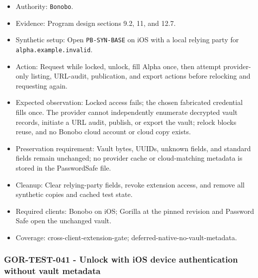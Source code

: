 \documentclass[
  letterpaper,
]{article}
\newcommand{\passthrough}[1]{#1}
\providecommand{\tightlist}{%
  \setlength{\itemsep}{0pt}\setlength{\parskip}{0pt}}
\begin{document}
\begin{itemize}
\tightlist
\item
  Authority: \passthrough{\lstinline!Bonobo!}.
\item
  Evidence: Program design sections 9.2, 11, and 12.7.
\item
  Synthetic setup: Open \nolinkurl{PB-SYN-BASE} on iOS with a local relying party for \nolinkurl{alpha.example.invalid}.
\item
  Action: Request while locked, unlock, fill Alpha once, then attempt provider-only listing, URL-audit, publication, and
  export actions before relocking and requesting again.
\item
  Expected observation: Locked access fails; the chosen fabricated credential fills once. The provider cannot
  independently enumerate decrypted vault records, initiate a URL audit, publish, or export the vault; relock blocks
  reuse, and no Bonobo cloud account or cloud copy exists.
\item
  Preservation requirement: Vault bytes, UUIDs, unknown fields, and standard fields remain unchanged; no provider cache
  or cloud-matching metadata is stored in the PasswordSafe file.
\item
  Cleanup: Clear relying-party fields, revoke extension access, and remove all synthetic copies and cached test state.
\item
  Required clients: Bonobo on iOS; Gorilla at the pinned revision and Password Safe open the unchanged vault.
\item
  Coverage: cross-client-extension-gate; deferred-native-no-vault-metadata.
\end{itemize}

\subsubsection{GOR-TEST-041 - Unlock with iOS device authentication without vault
metadata}\label{gor-test-041---unlock-with-ios-device-authentication-without-vault-metadata}
\end{document}
